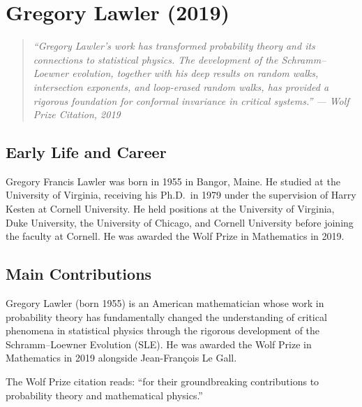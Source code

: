 \providecommand{\SLE}{\operatorname{SLE}}
\providecommand{\cap}{\operatorname{\mathrm{cap}}}

\chapter{Gregory Lawler (2019)}

\begin{quote}
\it ``Gregory Lawler's work has transformed probability theory and its connections to statistical physics. The development of the Schramm--Loewner evolution, together with his deep results on random walks, intersection exponents, and loop-erased random walks, has provided a rigorous foundation for conformal invariance in critical systems.'' --- Wolf Prize Citation, 2019
\end{quote}

\section{Early Life and Career}

Gregory Francis Lawler was born in 1955 in Bangor, Maine. He studied at the University of Virginia, receiving his Ph.D.\ in 1979 under the supervision of Harry Kesten at Cornell University. He held positions at the University of Virginia, Duke University, the University of Chicago, and Cornell University before joining the faculty at Cornell. He was awarded the Wolf Prize in Mathematics in 2019.

\section{Main Contributions}

Gregory Lawler (born 1955) is an American mathematician whose work in probability theory has fundamentally changed the understanding of critical phenomena in statistical physics through the rigorous development of the Schramm--Loewner Evolution (SLE). He was awarded the Wolf Prize in Mathematics in 2019 alongside Jean-Fran\c{c}ois Le Gall.

The Wolf Prize citation reads: ``for their groundbreaking contributions to probability theory and mathematical physics.''

